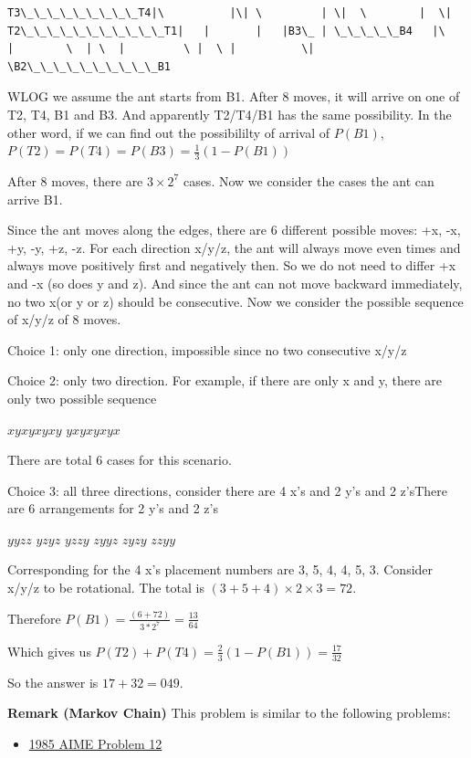 \begin{enumerate}
 \begin{verbatim}
T3\_\_\_\_\_\_\_\_\_T4|\          |\| \         | \|  \        |  \|  T2\_\_\_\_\_\_\_\_\_\_\_T1|   |       |   |B3\_ | \_\_\_\_\_B4   |\   |        \  | \  |         \ |  \ |          \|   \B2\_\_\_\_\_\_\_\_\_\_B1
\end{verbatim}

WLOG we assume the ant starts from B1. After 8 moves, it will arrive on one of T2, T4, B1 and B3. And apparently T2/T4/B1 has the same possibility. In the other word, if we can find out the possibililty of arrival of $P(B1)$, $P(T2)=P(T4)=P(B3)=\frac{1}{3} (1-P(B1))$

 After 8 moves, there are $3\times 2^7$ cases. Now we consider the cases the ant can arrive B1.

 Since the ant moves along the edges, there are 6 different possible moves: +x, -x, +y, -y, +z, -z. For each direction x/y/z, the ant will always move even times and always move positively first and negatively then. So we do not need to differ +x and -x (so does y and z). And since the ant can not move backward immediately, no two x(or y or z) should be consecutive. Now we consider the possible sequence of x/y/z of 8 moves.

 Choice 1: only one direction, impossible since no two consecutive x/y/z

 Choice 2: only two direction. For example, if there are only x and y, there are only two possible sequence

 $xyxyxyxy$ $yxyxyxyx$

 There are total 6 cases for this scenario.

 Choice 3: all three directions, consider there are 4 x's and 2 y's and 2 z'sThere are 6 arrangements for 2 y's and 2 z's

 $yyzz$ $yzyz$ $yzzy$ $zyyz$ $zyzy$ $zzyy$

 Corresponding for the 4 x's placement numbers are 3, 5, 4, 4, 5, 3. Consider x/y/z to be rotational. The total is $(3+5+4)\times 2\times 3=72$.

 Therefore $P(B1)=\frac{(6+72)}{3*2^7}=\frac{13}{64}$

 Which gives us $P(T2)+P(T4)=\frac{2}{3} (1-P(B1))=\frac{17}{32}$

 So the answer is $17+32=\boxed{049}$.

 \textbf{Remark (Markov Chain)} This problem is similar to the following problems:

 
            \begin{itemize}
        \item \href{https://artofproblemsolving.com/wiki/index.php/1985\_AIME\_Problems/Problem\_12}{1985 AIME Problem 12}
            \end{itemize}
            

\end{enumerate}
